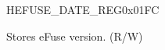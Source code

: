\begin{register}{H}{EFUSE\_DATE\_REG}{0x01FC}\label{regdesc:EFUSEDATEREG}
%
%
\regnewline%
\begin{regdesc}\begin{reglist}
\label{fielddesc:EFUSEDATE}\item [EFUSE\_DATE] Stores eFuse version. (R/W)
\end{reglist}\end{regdesc}
\end{register}
